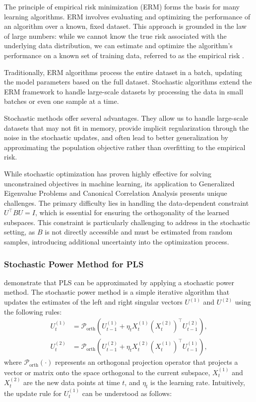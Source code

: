 The principle of empirical risk minimization (ERM) forms the basis for many learning algorithms. ERM involves evaluating and optimizing the performance of an algorithm over a known, fixed dataset. This approach is grounded in the law of large numbers: while we cannot know the true risk associated with the underlying data distribution, we can estimate and optimize the algorithm's performance on a known set of training data, referred to as the empirical risk \citep{vapnik1999nature}.

Traditionally, ERM algorithms process the entire dataset in a batch, updating the model parameters based on the full dataset. Stochastic algorithms extend the ERM framework to handle large-scale datasets by processing the data in small batches or even one sample at a time. 

Stochastic methods offer several advantages. They allow us to handle large-scale datasets that may not fit in memory, provide implicit regularization through the noise in the stochastic updates, and often lead to better generalization by approximating the population objective rather than overfitting to the empirical risk.

While stochastic optimization has proven highly effective for solving unconstrained objectives in machine learning, its application to Generalized Eigenvalue Problems and Canonical Correlation Analysis presents unique challenges. The primary difficulty lies in handling the data-dependent constraint $U^\top B U = I$, which is essential for ensuring the orthogonality of the learned subspaces. This constraint is particularly challenging to address in the stochastic setting, as $B$ is not directly accessible and must be estimated from random samples, introducing additional uncertainty into the optimization process.

\subsubsection{Stochastic Power Method for PLS}
\citet{arora2016stochastic} demonstrate that PLS can be approximated by applying a stochastic power method. The stochastic power method is a simple iterative algorithm that updates the estimates of the left and right singular vectors $U^{(1)}$ and $U^{(2)}$ using the following rules:
\begin{align*}
U^{(1)}_t &= \mathcal{P}_{\text{orth}} \left( U^{(1)}_{t-1} + \eta_t X_t^{(1)} (X_t^{(2)})^\top U^{(2)}_{t-1} \right), \\
U^{(2)}_t &= \mathcal{P}_{\text{orth}} \left( U^{(2)}_{t-1} + \eta_t X_t^{(2)} (X_t^{(1)})^\top U^{(1)}_{t-1} \right),
\end{align*}
where $\mathcal{P}_{\text{orth}}(\cdot)$ represents an orthogonal projection operator that projects a vector or matrix onto the space orthogonal to the current subspace, $X_t^{(1)}$ and $X_t^{(2)}$ are the new data points at time $t$, and $\eta_t$ is the learning rate.
Intuitively, the update rule for $U^{(1)}_t$ can be understood as follows:

